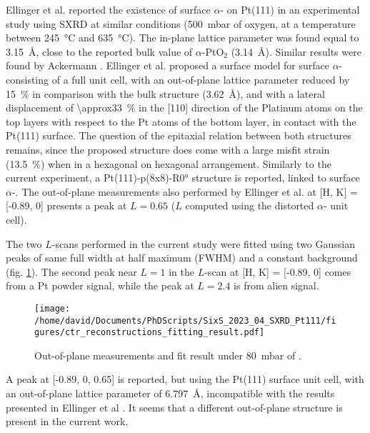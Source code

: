 Ellinger et al. \parencite*{Ellinger2008} reported the existence of surface $\alpha$- on Pt(111) in an experimental study using SXRD at similar conditions (\qty{500}{\milli\bar} of oxygen, at a temperature between \qty{245}{\degreeCelsius} and \qty{635}{\degreeCelsius}).
The in-plane lattice parameter was found equal to \qty{3.15}{\angstrom}, close to the reported bulk value of $\alpha$-PtO$_2$ (\qty{3.14}{\angstrom}).
Similar results were found by Ackermann \parencite*{Ackermann2007}.
Ellinger et al. \parencite*{Ellinger2008} proposed a surface model for surface $\alpha$- consisting of a full unit cell, with an out-of-plane lattice parameter reduced by \qty{15}{\percent} in comparison with the bulk structure (\qty{3.62}{\angstrom}), and with a lateral displacement of \qty{\approx33}{\percent} in the [110] direction of the Platinum atoms on the top layers with respect to the Pt atoms of the bottom layer, in contact with the Pt(111) surface.
The question of the epitaxial relation between both structures remains, since the proposed structure does come with a large misfit strain (\qty{13.5}{\percent}) when in a hexagonal on hexagonal arrangement.
Similarly to the current experiment, a Pt(111)-p(8x8)-R\ang{0} structure is reported, linked to surface $\alpha$-.
The out-of-plane measurements also performed by Ellinger et al. \parencite*{Ellinger2008} at [H, K] = [-0.89, 0] presents a peak at $L=0.65$ ($L$ computed using the distorted $\alpha$- unit cell).

The two $L$-scans performed in the current study were fitted using two Gaussian peaks of same full width at half maximum (FWHM) and a constant background (fig. \ref{fig:LScans80Fit}).
The second peak near $L=1$ in the $L$-scan at [H, K] = [-0.89, 0] comes from a Pt powder signal, while the peak at $L=2.4$ is from alien signal.

\begin{figure}[!htb]
    \centering
    \texttt{[image: /home/david/Documents/PhDScripts/SixS\_2023\_04\_SXRD\_Pt111/figures/ctr\_reconstructions\_fitting\_result.pdf]}
    \caption{
        Out-of-plane measurements and fit result under \qty{80}{\milli\bar} of .
    }
    \label{fig:LScans80Fit}
\end{figure}

A peak at [-0.89, 0, 0.65] is reported, but using the Pt(111) surface unit cell, with an out-of-plane lattice parameter of \qty{6.797}{\angstrom}, incompatible with the results presented in Ellinger et al \parencite*{Ellinger2008}.
It seems that a different out-of-plane structure is present in the current work.

